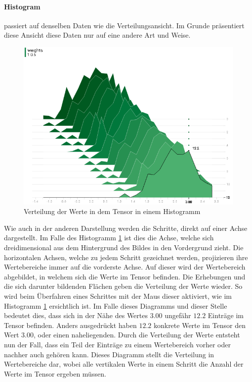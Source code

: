 \paragraph{Histogram} passiert auf denselben Daten wie die Verteilungsansicht. 
Im Grunde präsentiert diese Ansicht diese Daten nur auf eine andere Art und Weise. 
\begin{figure}
	\centering
	\includegraphics[scale=0.7]{images/histogram-value.png}
	\caption{Verteilung der Werte in dem Tensor in einem Histogramm}
	\label{fig:Histogram}
\end{figure}
Wie auch in der anderen Darstellung werden die Schritte, direkt auf einer Achse dargestellt. 
Im Falle des Histogramm \ref{fig:Histogram} ist dies die Achse, welche sich dreidimensional aus dem Hintergrund des Bildes in den Vordergrund zieht. 
Die horizontalen Achsen, welche zu jedem Schritt gezeichnet werden, projizieren ihre Wertebereiche immer auf die vorderste Achse. 
Auf dieser wird der Wertebereich abgebildet, in welchem sich die Werte im Tensor befinden. 
Die Erhebungen und die sich darunter bildenden Flächen geben die Verteilung der Werte wieder. 
So wird beim Überfahren eines Schrittes mit der Maus dieser aktiviert, wie im Histogramm \ref{fig:Histogram} ersichtlich ist. 
Im Falle dieses Diagramms und dieser Stelle bedeutet dies, dass sich in der Nähe des Wertes $3.00$ ungefähr $12.2$ Einträge im Tensor befinden. 
Anders ausgedrückt haben $12.2$ konkrete Werte im Tensor den Wert $3.00$, oder einen naheliegenden. 
Durch die Verteilung der Werte entsteht nun der Fall, dass ein Teil der Einträge zu einem Wertebereich vorher oder nachher auch gehören kann. 
Dieses Diagramm stellt die Verteilung in Wertebereiche dar, wobei alle vertikalen Werte in einem Schritt die Anzahl der Werte im Tensor ergeben müssen. 
